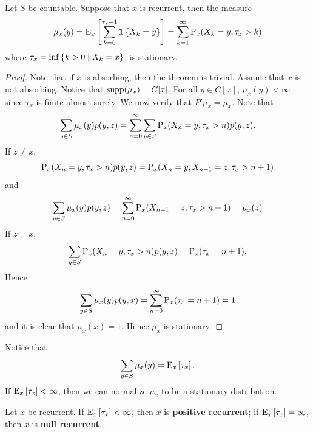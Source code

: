 \begin{theorem}\label{thm:stationary_exist}
    Let $S$ be countable. Suppose that $x$ is recurrent, 
    then the measure 
    \begin{equation*}
        \mu_x(y) = \E_x\sbrc{\sum_{k=0}^{\tau_x-1}\one\set{X_k = y}} = \sum_{k=1}^\infty \P_x(X_k=y,\tau_x>k)
    \end{equation*}
    where $\tau_x = \inf\Set{k>0}{X_k = x}$, is stationary. 
\end{theorem}
\begin{proof}
    Note that if $x$ is absorbing, then the theorem is trivial. Assume that 
    $x$ is not absorbing. Notice that $\supp{\mu_x} = C[x]$. For all $y\in C[x]$, 
    $\mu_x(y)<\infty$ since $\tau_x$ is finite almost surely. We now verify that 
    $P'\mu_x = \mu_x$. Note that 
    \begin{equation*}
        \sum_{y\in S} \mu_x(y)p(y,z) = \sum_{n=0}^\infty\sum_{y\in S} \P_x(X_n = y, \tau_x>n)p(y,z).
    \end{equation*}
    If $z\neq x$, 
    \begin{equation*}
        \P_x(X_n = y, \tau_x>n)p(y,z) = \P_x(X_n = y, X_{n+1} = z,\tau_x>{n+1})
    \end{equation*}
    and 
    \begin{equation*}
        \sum_{y\in S} \mu_x(y)p(y,z) = \sum_{n=0}^\infty\P_x(X_{n+1} = z, \tau_x>n+1) = \mu_x(z)
    \end{equation*}
    If $z = x$, 
    \begin{equation*}
        \sum_{y\in S}\P_x(X_n = y, \tau_x>n)p(y,z) = \P_x(\tau_x = n+1).
    \end{equation*}
    Hence 
    \begin{equation*}
        \sum_{y\in S}\mu_x(y)p(y,x) = \sum_{n=0}^\infty\P_x(\tau_x = n+1) = 1
    \end{equation*}
    and it is clear that $\mu_x(x) = 1$. Hence $\mu_x$ is 
    stationary. 
\end{proof}
\begin{remark}
    Notice that 
    \begin{equation*}
        \sum_{y\in S}\mu_x(y) = \E_x\sbrc{\tau_x}. 
    \end{equation*}
    If $\E_x\sbrc{\tau_x}<\infty$, then we can normalize 
    $\mu_x$ to be a stationary distribution. 
\end{remark}

\begin{definition}
    Let $x$ be recurrent. If $\E_x\sbrc{\tau_x}<\infty$, 
    then $x$ is \textbf{positive recurrent}; if 
    $\E_x\sbrc{\tau_x}=\infty$, then $x$ is \textbf{null 
    recurrent}. 
\end{definition}

